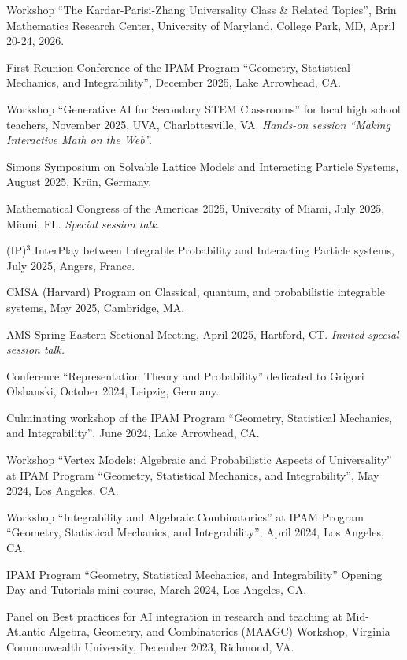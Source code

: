 \documentclass[letterpaper,11pt]{article}
\begin{document}
\begin{etaremune}

\item Workshop ``The Kardar-Parisi-Zhang Universality Class \& Related Topics'',
Brin Mathematics Research Center, University of Maryland, College Park, MD,
April 20-24, 2026.

\item First Reunion Conference of the
IPAM Program ``Geometry, Statistical Mechanics, and Integrability'',
December 2025, Lake Arrowhead, CA.

\item
Workshop ``Generative AI for Secondary STEM Classrooms'' for local high school teachers,
November 2025, UVA, Charlottesville, VA.
\emph{Hands-on session ``Making Interactive Math on the Web''.}

\item Simons Symposium on Solvable Lattice Models and Interacting Particle Systems, August 2025, Kr\"un, Germany.

\item Mathematical Congress of the Americas 2025,
	University of Miami,
	July 2025, Miami, FL.
	\emph{Special session talk.}

\item (IP)$^3$ InterPlay between Integrable Probability and Interacting Particle systems,
 July 2025, Angers, France.

\item CMSA (Harvard) Program on Classical, quantum, and probabilistic integrable systems, May 2025,
Cambridge, MA.

\item AMS Spring Eastern Sectional Meeting,
	April 2025,
	Hartford, CT.
	\emph{Invited special session talk.}

\item
Conference ``Representation Theory and Probability'' dedicated to Grigori Olshanski,
October 2024, Leipzig, Germany.

	\item
		Culminating workshop of the
		IPAM Program ``Geometry, Statistical Mechanics, and Integrability'',
		June 2024, Lake Arrowhead, CA.
	\item
		Workshop
		``Vertex Models: Algebraic and Probabilistic Aspects of Universality''
		at
		IPAM Program ``Geometry, Statistical Mechanics, and Integrability'',
		May 2024, Los Angeles, CA.
	\item
		Workshop ``Integrability and Algebraic Combinatorics''
		at
		IPAM Program ``Geometry, Statistical Mechanics, and Integrability'',
		April 2024, Los Angeles, CA.
	\item
	IPAM Program ``Geometry, Statistical Mechanics, and Integrability''
	Opening Day and Tutorials mini-course, March 2024, Los Angeles, CA.
	\item
	Panel on Best practices for AI integration in research and teaching
	at
	Mid-Atlantic Algebra, Geometry, and Combinatorics (MAAGC) Workshop,
	Virginia Commonwealth University,
	December 2023,
	Richmond, VA.


\end{etaremune}
\end{document}
